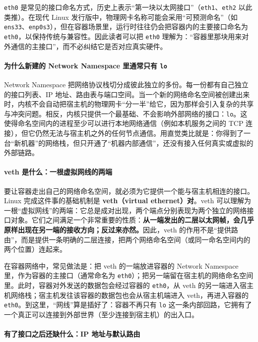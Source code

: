 \texttt{eth0} 是常见的接口命名方式，历史上表示“第一块以太网接口”（\texttt{eth1}、\texttt{eth2} 以此类推）。在现代 Linux 发行版中，物理网卡名称可能会采用“可预测命名”（如 \texttt{ens33}、\texttt{enp0s3}），但在容器场景里，运行时往往仍会把容器内的主要接口命名为 \texttt{eth0}，以保持传统与兼容性。因此读者可以把 \texttt{eth0} 理解为：“容器里那块用来对外通信的主接口”，而不必纠结它是否对应真实硬件。

\paragraph{为什么新建的 Network Namespace 里通常只有 \texttt{lo}}

Network Namespace 把网络协议栈切分成彼此独立的多份。每一份都有自己独立的接口列表、IP 地址、路由表与端口空间。当一个新的网络命名空间被创建出来时，内核不会自动把宿主机的物理网卡“分一半”给它，因为那样会引入复杂的共享与冲突问题。相反，内核只提供一个最基础、不会影响外部网络的接口：\texttt{lo}。这使得命名空间内的进程至少可以进行本地网络通信（例如本机服务之间的 TCP 连接），但它仍然无法与宿主机之外的任何节点通信。用直觉类比就是：你得到了一台“新机器”的网络栈，但只开通了“机器内部通信”，还没有接入任何真实或虚拟的外部链路。

\paragraph{veth 是什么：一根虚拟网线的两端}

要让容器走出自己的网络命名空间，就必须为它提供一个能与宿主机相连的接口。Linux 完成这件事的基础机制是 \textbf{veth（virtual ethernet）对}。veth 可以理解为一根“虚拟网线”的两端：它总是成对出现，两个端点分别表现为两个独立的网络接口对象。它们之间满足一个非常重要的性质：\textbf{从一端发出的二层以太网帧，会几乎原样出现在另一端的接收方向；反过来亦然。}因此，veth 的作用不是“提供路由”，而是提供一条明确的二层连接，把两个网络命名空间（或同一命名空间内的两个位置）连起来。

在容器网络中，常见做法是：把 veth 的一端放进容器的 Network Namespace 里，作为容器的主接口（通常命名为 \texttt{eth0}）；把另一端留在宿主机的网络命名空间里。此时，容器对外发送的数据包会经过容器的 \texttt{eth0}，从 veth 的另一端进入宿主机网络栈；宿主机发往该容器的数据包也会从宿主机端进入 veth，再进入容器的 \texttt{eth0}。到这里，“网线”算是插好了：容器不再只有 \texttt{lo} 这一条内部回路，它拥有了一个真正可以连接到外部世界（至少连接到宿主机）的出入口。

\paragraph{有了接口之后还缺什么：IP 地址与默认路由}

